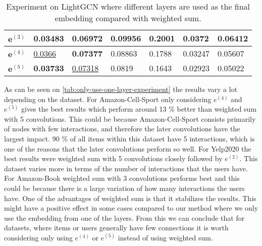 \begin{table*}[]
\begin{tabular}{|l|l|l|l|l|l|l|}
        $\mathbf{e}^{(3)}$   & 0.03483                                & 0.06972                       & 0.09956                          & 0.2001            & 0.0372              & 0.06412             \\ \hline
        $\mathbf{e}^{(4)}$   & \underline{0.0366}                     & \textbf{0.07377}              & 0.08863                          & 0.1788            & 0.03247             & 0.05607             \\ \hline
        $\mathbf{e}^{(5)}$   & \textbf{0.03733}                       & \underline{0.07318}           & 0.0819                           & 0.1643            & 0.02923             & 0.05022             \\ \hline
    \end{tabular}
    \centering
    \caption{Experiment on LightGCN where different layers are used as the final embedding compared with weighted sum.}
    \label{tab:only-use-one-layer-experiment}
\end{table*}
As can be seen on \autoref{tab:only-use-one-layer-experiment} the results vary a lot depending on the dataset.
For Amazon-Cell-Sport only considering $e^{(4)}$ and $e^{(5)}$ gives the best results which perform around 13 \% better than weighted sum with 5 convolutions.
This could be because Amazon-Cell-Sport consists primarily of nodes with few interactions, and therefore the later convolutions have the largest impact. 
90 \% of all items within this dataset have 5 interactions, which is one of the reasons that the later convolutions perform so well.
For Yelp2020 the best results were weighted sum with 5 convolutions closely followed by $e^{(2)}$.
This dataset varies more in terms of the number of interactions that the users have.
For Amazon-Book weighted sum with 3 convolutions performs best and this could be because there is a large variation of how many interactions the users have.
One of the advantages of weighted sum is that it stabilizes the results.
This might have a positive effect in some cases compared to our method where we only use the embedding from one of the layers.
From this we can conclude that for datasets, where items or users generally have few connections it is worth considering only using $e^{(4)}$ or $e^{(5)}$ instead of using weighted sum.

